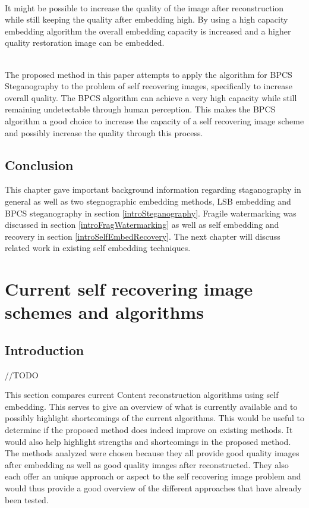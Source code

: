 \documentclass[12pt]{article}
\begin{document}
\hspace{0pt} \\
It might be possible to increase the quality of the image after reconstruction while still keeping the quality after embedding high.
By using a high capacity embedding algorithm the overall embedding capacity is increased and a higher quality restoration image can be embedded. 

\hspace{0pt} \\
The proposed method in this paper attempts to apply the algorithm for BPCS Steganography
to the problem of self recovering images, specifically to increase overall quality.
The BPCS algorithm can achieve a very high capacity while still remaining undetectable through human perception.
This makes the BPCS algorithm a good choice to increase the capacity of a self recovering image scheme and possibly increase the quality through this process.

\subsection{Conclusion}
\label{introConclusion}
This chapter gave important background information regarding staganography in general as well as two stegnographic embedding methods, LSB embedding and BPCS steganography in section \ref{introSteganography}.
Fragile watermarking was discussed in section \ref{introFragWatermarking} as well as self embedding and recovery in section \ref{introSelfEmbedRecovery}.
The next chapter will discuss related work in existing self embedding techniques.

\section{Current self recovering image schemes and algorithms}

\subsection{Introduction}
//TODO

This section compares current Content reconstruction algorithms using self embedding.
This serves to give an overview of what is currently available and to possibly highlight shortcomings of the current algorithms.
This would be useful to determine if the proposed method does indeed improve on existing methods. 
It would also help highlight strengths and shortcomings in the proposed method.
The methods analyzed were chosen because they all provide good quality images after embedding as well as good quality images after reconstructed.
They also each offer an unique approach or aspect to the self recovering image problem and would thus provide a good overview of the different approaches that have already been tested.
\end{document}
